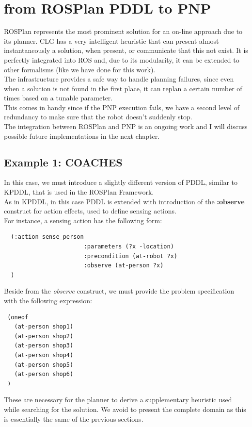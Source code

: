 \documentclass[pdftex,12pt,a4paper]{report}
\begin{document}
\section{from ROSPlan PDDL to PNP}
\noindent ROSPlan represents the most prominent solution for an on-line approach due to its planner.
CLG has a very intelligent heuristic that can present almost instantaneously a solution, when present, or communicate that this not exist. 
It is perfectly integrated into ROS and, due to its modularity, it can be extended to other formalisms (like we have done for this work).\\

\noindent The infrastructure provides a safe way to handle planning failures, since even when a solution is not found in the first place, it can replan a certain number of times based on a tunable parameter.\\
This comes in handy since if the PNP execution fails, we have a second level of redundancy to make sure that the robot doesn't suddenly stop. \\
The integration between ROSPlan and PNP is an ongoing work and I will discuss possible future implementations in the next chapter.

\subsection{Example 1: COACHES}
In this case, we must introduce a slightly different version of PDDL, similar to KPDDL, that is used in the ROSPlan Framework.\\
As in KPDDL, in this case PDDL is extended with introduction of the \textbf{:observe} construct for action effects, used to define sensing actions.\\
For instance, a sensing action has the following form:
\begin{verbatim}
  (:action sense_person
                       :parameters (?x -location)
                       :precondition (at-robot ?x)
                       :observe (at-person ?x)
  )
\end{verbatim}
Beside from the \textit{observe} construct, we must provide the problem specification with the following expression:
\begin{verbatim}
 (oneof
   (at-person shop1)
   (at-person shop2)
   (at-person shop3)
   (at-person shop4)
   (at-person shop5)
   (at-person shop6)
 )
\end{verbatim}
These are necessary for the planner to derive a supplementary heuristic used while searching for the solution. We avoid to present the complete domain as this is essentially the same of the previous sections.\\
\end{document}
